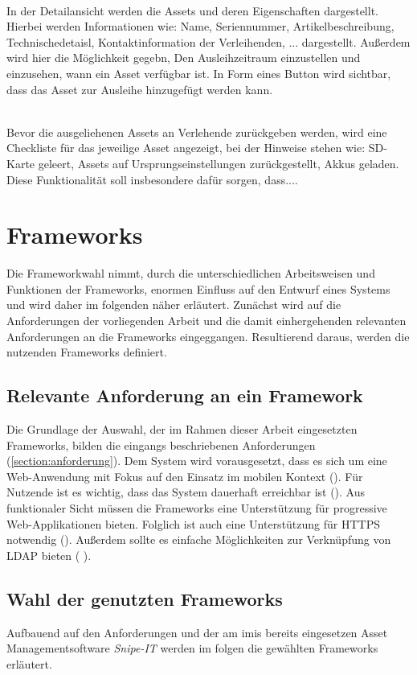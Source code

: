     {\sffamily\color{maincolor}{Ft-A-6 | Detailsansicht }}\\
In der Detailansicht werden die Assets und deren Eigenschaften dargestellt.
Hierbei werden Informationen wie: Name, Seriennummer, Artikelbeschreibung,
Technischedetaisl, Kontaktinformation der Verleihenden, ... dargestellt.
Außerdem wird hier die Möglichkeit gegebn, Den Ausleihzeitraum einzustellen und
einzusehen, wann ein Asset verfügbar ist. In Form eines Button wird sichtbar,
dass das Asset zur Ausleihe hinzugefügt werden kann.

    {\sffamily\color{maincolor}{Ft-A-7 | Rückgabe-Checkliste}}\\
Bevor die ausgeliehenen Assets an Verlehende zurückgeben werden, wird eine
Checkliste für das jeweilige Asset angezeigt, bei der Hinweise stehen wie:
SD-Karte geleert, Assets auf Ursprungseinstellungen zurückgestellt, Akkus
geladen. Diese Funktionalität soll insbesondere dafür sorgen, dass....

\section{Frameworks}
\label{section:frameworks}
Die Frameworkwahl nimmt, durch die unterschiedlichen Arbeitsweisen und
Funktionen der Frameworks, enormen Einfluss auf den Entwurf eines Systems und
wird daher im folgenden näher erläutert. Zunächst wird auf die Anforderungen der
vorliegenden Arbeit und die damit einhergehenden relevanten Anforderungen an die
Frameworks eingeggangen. Resultierend daraus, werden die nutzenden Frameworks
definiert.

\subsection{Relevante Anforderung an ein Framework}
Die Grundlage der Auswahl, der im Rahmen dieser Arbeit eingesetzten Frameworks,
bilden die eingangs beschriebenen Anforderungen (\ref{section:anforderung}). Dem
System wird vorausgesetzt, dass es sich um eine Web-Anwendung mit Fokus auf den
Einsatz im mobilen Kontext (). Für Nutzende ist es
wichtig, dass das System dauerhaft erreichbar ist (). Aus
funktionaler Sicht müssen die Frameworks eine Unterstützung für progressive
Web-Applikationen bieten. Folglich ist auch eine Unterstützung für HTTPS
notwendig (). Außerdem sollte es einfache Möglichkeiten zur
Verknüpfung von LDAP bieten ( ).

\subsection{Wahl der genutzten Frameworks}
Aufbauend auf den Anforderungen und der am \ac{imis} bereits eingesetzen Asset
Managementsoftware \textit{Snipe-IT} werden im folgen die gewählten Frameworks
erläutert.

